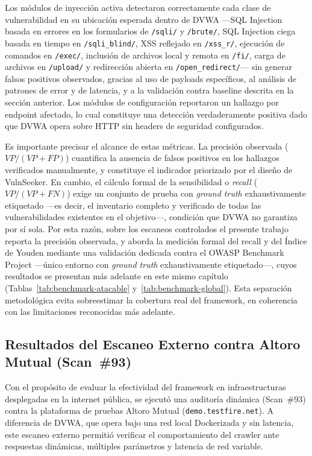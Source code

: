 \documentclass[12pt, a4paper]{article}
\begin{document}
Los módulos de inyección activa detectaron correctamente cada clase de
vulnerabilidad en su ubicación esperada dentro de DVWA ---SQL Injection
basada en errores en los formularios de \texttt{/sqli/} y \texttt{/brute/},
SQL Injection ciega basada en tiempo en \texttt{/sqli\_blind/}, XSS reflejado
en \texttt{/xss\_r/}, ejecución de comandos en \texttt{/exec/}, inclusión de
archivos local y remota en \texttt{/fi/}, carga de archivos en \texttt{/upload/}
y redirección abierta en \texttt{/open\_redirect/}--- sin generar falsos
positivos observados, gracias al uso de payloads específicos, al análisis de
patrones de error y de latencia, y a la validación contra baseline descrita en
la sección anterior. Los módulos de configuración reportaron un hallazgo por endpoint
afectado, lo cual constituye una detección verdaderamente positiva dado que
DVWA opera sobre HTTP sin headers de seguridad configurados.

Es importante precisar el alcance de estas métricas. La precisión observada
($VP / (VP + FP)$) cuantifica la ausencia de falsos positivos en los hallazgos
verificados manualmente, y constituye el indicador priorizado por el diseño de
VulnSeeker. En cambio, el cálculo formal de la
sensibilidad o \textit{recall} ($VP / (VP + FN)$) exige un conjunto de prueba
con \textit{ground truth} exhaustivamente etiquetado ---es decir, el inventario
completo y verificado de todas las vulnerabilidades existentes en el objetivo---,
condición que DVWA no garantiza por sí sola. Por esta razón, sobre los escaneos
controlados el presente trabajo reporta la precisión observada, y aborda la
medición formal del recall y del Índice de Youden mediante una validación dedicada
contra el OWASP Benchmark Project ---único entorno con \textit{ground truth}
exhaustivamente etiquetado---, cuyos resultados se presentan más adelante en este
mismo capítulo (Tablas~\ref{tab:benchmark-atacable} y~\ref{tab:benchmark-global}).
Esta separación metodológica
evita sobreestimar la cobertura real del framework, en coherencia con las
limitaciones reconocidas más adelante.

\subsection{Resultados del Escaneo Externo contra Altoro Mutual (Scan~\#93)}

Con el propósito de evaluar la efectividad del framework en infraestructuras desplegadas en la internet pública, se ejecutó una auditoría dinámica
(Scan~\#93) contra la plataforma de pruebas Altoro Mutual (\texttt{demo.testfire.net}).
A diferencia de DVWA, que opera bajo una red local Dockerizada y sin latencia, este escaneo
externo permitió verificar el comportamiento del crawler ante respuestas dinámicas,
múltiples parámetros y latencia de red variable.
\end{document}
